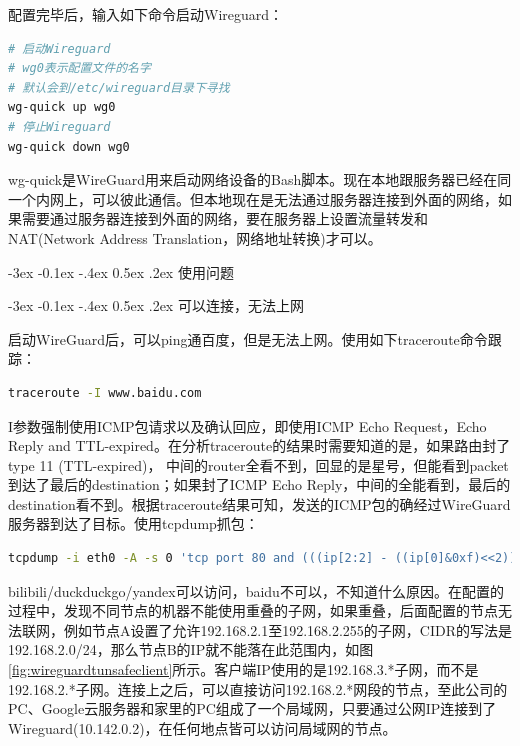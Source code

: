 \documentclass[8pt]{book}
\makeatletter
\numberwithin{dummy}{section}
\theoremstyle{ocrenumbox}
\theoremstyle{blacknumex}
\theoremstyle{blacknumbox}
\theoremstyle{ocrenum}
\renewcommand{\subsection}{\@startsection {subsection}{2}{\z@}
	{-3ex \@plus -0.1ex \@minus -.4ex}
	{0.5ex \@plus.2ex }
	{\normalfont\sffamily\bfseries}}
\makeatother
\begin{document}
配置完毕后，输入如下命令启动Wireguard：

\begin{lstlisting}[language=Bash]
# 启动Wireguard
# wg0表示配置文件的名字
# 默认会到/etc/wireguard目录下寻找
wg-quick up wg0
# 停止Wireguard
wg-quick down wg0
\end{lstlisting}

wg-quick是WireGuard用来启动网络设备的Bash脚本。现在本地跟服务器已经在同一个内网上，可以彼此通信。但本地现在是无法通过服务器连接到外面的网络，如果需要通过服务器连接到外面的网络，要在服务器上设置流量转发和NAT(Network Address Translation，网络地址转换)才可以。

\subsection{使用问题}

\subsection{可以连接，无法上网}

启动WireGuard后，可以ping通百度，但是无法上网。使用如下traceroute命令跟踪：

\begin{lstlisting}[language=Bash]
traceroute -I www.baidu.com
\end{lstlisting}

I参数强制使用ICMP包请求以及确认回应，即使用ICMP Echo Request，Echo Reply and TTL-expired。在分析traceroute的结果时需要知道的是，如果路由封了type 11 (TTL-expired)， 中间的router全看不到，回显的是星号，但能看到packet到达了最后的destination；如果封了ICMP Echo Reply，中间的全能看到，最后的destination看不到。根据traceroute结果可知，发送的ICMP包的确经过WireGuard服务器到达了目标。使用tcpdump抓包：

\begin{lstlisting}[language=Bash]
tcpdump -i eth0 -A -s 0 'tcp port 80 and (((ip[2:2] - ((ip[0]&0xf)<<2)) - ((tcp[12]&0xf0)>>2)) != 0)'|grep "bilibili"
\end{lstlisting}

bilibili/duckduckgo/yandex可以访问，baidu不可以，不知道什么原因。在配置的过程中，发现不同节点的机器不能使用重叠的子网，如果重叠，后面配置的节点无法联网，例如节点A设置了允许192.168.2.1至192.168.2.255的子网，CIDR的写法是192.168.2.0/24，那么节点B的IP就不能落在此范围内，如图\ref{fig:wireguardtunsafeclient}所示。客户端IP使用的是192.168.3.*子网，而不是192.168.2.*子网。连接上之后，可以直接访问192.168.2.*网段的节点，至此公司的PC、Google云服务器和家里的PC组成了一个局域网，只要通过公网IP连接到了Wireguard(10.142.0.2)，在任何地点皆可以访问局域网的节点。
\end{document}
